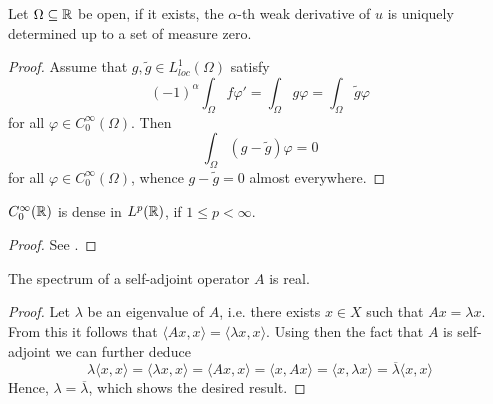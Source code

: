\begin{atheorem} \label{athem:uniqueness_of_weak_deriv}
	Let $\Omega \subseteq \mathbb{R}$ be open, if it exists, the $\alpha$-th weak derivative of $u$ is uniquely determined up to a set of measure zero.
	
	\begin{proof}
		Assume that $g, \tilde{g} \in L_{loc}^{1}(\Omega)$ satisfy
		\[ (-1)^{\alpha} \int_{\Omega} f \varphi' = \int_{\Omega} g \varphi  = \int_{\Omega} \tilde{g} \varphi  \]
		for all $\varphi \in C_{0}^{\infty}(\Omega)$. Then
		\[ \int_{\Omega} \left( g - \tilde{g} \right) \varphi = 0 \]	
		for all $\varphi \in C_{0}^{\infty}(\Omega)$, whence $g - \tilde{g} = 0$ almost everywhere.	
	\end{proof}
\end{atheorem}   

\begin{atheorem}
	$C_{0}^{\infty}(\mathbb{R})$ is dense in $L^{p}(\mathbb{R})$, if $1 \leq p < \infty$.
	
	\begin{proof}
		See \cite[p. 82]{werner2006funkana}. %
	\end{proof}
\end{atheorem}

\begin{atheorem}
	The spectrum of a self-adjoint operator $A$ is real. \label{spectrul-sa-real}
	
	\begin{proof}
		Let $\lambda$ be an eigenvalue of $A$, i.e. there exists $x \in X$ such that $A x = \lambda x$. From this it follows that $\langle A x, x \rangle = \langle \lambda x , x \rangle$. Using then the fact that $A$ is self-adjoint we can further deduce
		\[ \lambda \langle x , x \rangle = \langle \lambda x , x \rangle = \langle A x, x \rangle = \langle x, A x \rangle = \langle x , \lambda x \rangle = \overline{\lambda} \langle  x , x \rangle \]
		Hence, $\lambda = \overline{\lambda}$, which shows the desired result.
	\end{proof}
\end{atheorem}

